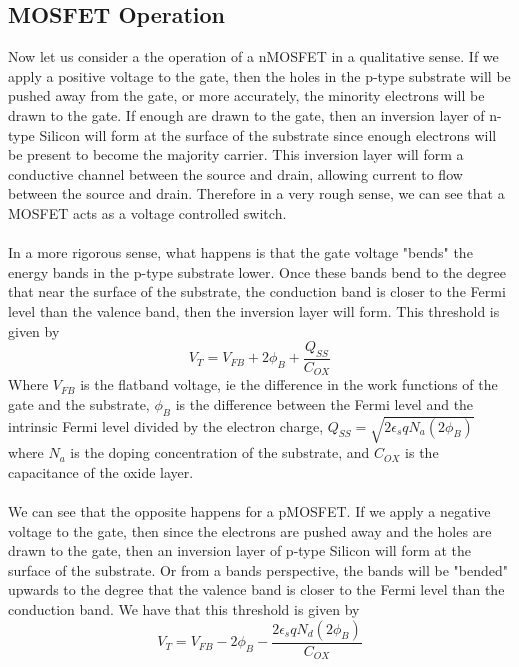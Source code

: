 \documentclass[
  reprint,
  amsmath,amssymb,
  aps
]{revtex4-1}
\begin{document}
\subsection{\label{sec:level2}MOSFET Operation}
Now let us consider a the operation of a nMOSFET in a qualitative sense. If we apply a positive voltage to the gate, then 
the holes in the p-type substrate will be pushed away from the gate, or more accurately, the minority electrons will be drawn 
to the gate. If enough are drawn to the gate, then an inversion layer of n-type Silicon will form at the surface of the substrate since 
enough electrons will be present to become the majority carrier. This inversion layer will form a conductive channel between the source and drain, 
allowing current to flow between the source and drain. Therefore in a very rough sense, we can see that a MOSFET acts 
as a voltage controlled switch.\\\\
In a more rigorous sense, what happens is that the gate voltage "bends" the energy bands in the p-type substrate lower. 
Once these bands bend to the degree that near the surface of the substrate, the conduction band is closer to the 
Fermi level than the valence band, then the inversion layer will form. This threshold is given by \cite{ChenmingHu5}
\begin{equation}
    V_{T} = V_{FB} + 2\phi_{B} + \frac{Q_{SS}}{C_{OX}}
    \label{eq:threshold_nMOSFET}
\end{equation}
Where $V_{FB}$ is the flatband voltage, ie the difference in the work functions of the gate and the substrate, $\phi_{B}$ is the 
difference between the Fermi level and the intrinsic Fermi level divided by the electron charge, $Q_{SS}=\sqrt{2\epsilon_{s}qN_{a}(2\phi_{B})}$ where 
$N_a$ is the doping concentration of the substrate, and $C_{OX}$ is the capacitance of the oxide layer.\\\\
We can see that the opposite happens for a pMOSFET. If we apply a negative voltage to the gate, then since the electrons are pushed 
away and the holes are drawn to the gate, then an inversion layer of p-type Silicon will form at the surface of the substrate. Or 
from a bands perspective, the bands will be "bended" upwards to the degree that the valence band is closer to the Fermi level than the
conduction band. We have that this threshold is given by \cite{ChenmingHu5}
\begin{equation}
    V_{T} = V_{FB} - 2\phi_{B} - \frac{2\epsilon_{s}qN_{d}(2\phi_{B})}{C_{OX}}
    \label{eq:threshold_pMOSFET}
\end{equation}
\end{document}
